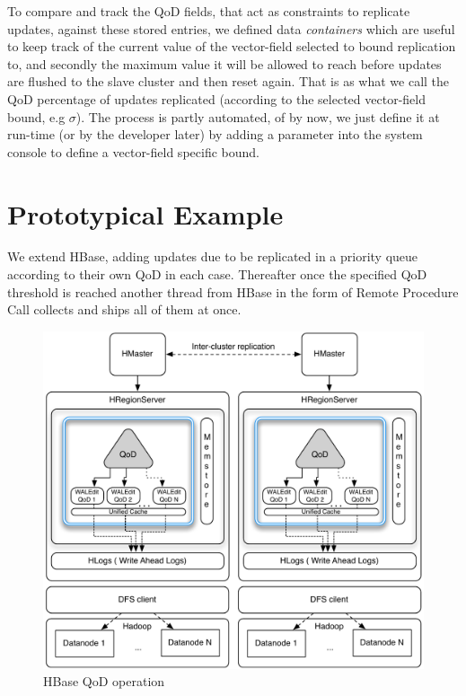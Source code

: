 To compare and track the QoD fields, that act as constraints to replicate updates, against these stored entries, we defined data \emph{containers} which are useful to keep track of the current value of the vector-field selected to bound replication to, and secondly the maximum value it will be allowed to reach before updates are flushed to the slave cluster and then reset again. That is as what we call the QoD percentage of updates replicated (according to the selected vector-field bound, e.g $\sigma$). The process is partly automated, of by now, we just define it at run-time (or by the developer later) by adding a parameter into the system console to define a vector-field specific bound.

\section{Prototypical Example}
We extend HBase, adding updates due to be replicated in a priority queue according to their own QoD in each case. Thereafter once the specified QoD threshold is reached another thread from HBase in the form of Remote Procedure Call collects and ships all of them at once.

\begin{figure}[t]
\centering
\includegraphics[width=0.8\linewidth]{figs/multi-site.pdf}
\caption{HBase QoD operation}
\label{fig-qod-module}
\end{figure}

